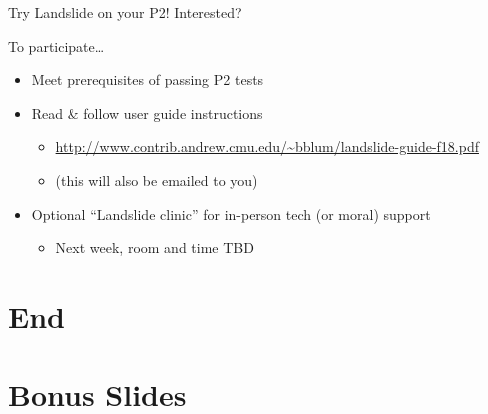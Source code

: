 \documentclass[xcolor=dvipsnames]{beamer}
\begin{document}
\begin{frame}{Try Landslide on your P2!}
	Interested?
	\linegap

	To participate\dots
	\begin{itemize}
		\item Meet prerequisites of passing P2 tests
		\item Read \& follow user guide instructions
			\begin{itemize}
				\item \url{http://www.contrib.andrew.cmu.edu/~bblum/landslide-guide-f18.pdf}
				\item (this will also be emailed to you)
			\end{itemize}
		\item Optional ``Landslide clinic'' for in-person tech (or moral) support
			\begin{itemize}
				\item Next week, room and time TBD
			\end{itemize}
	\end{itemize}
\end{frame}


\section{End}


\section{Bonus Slides}
\end{document}
